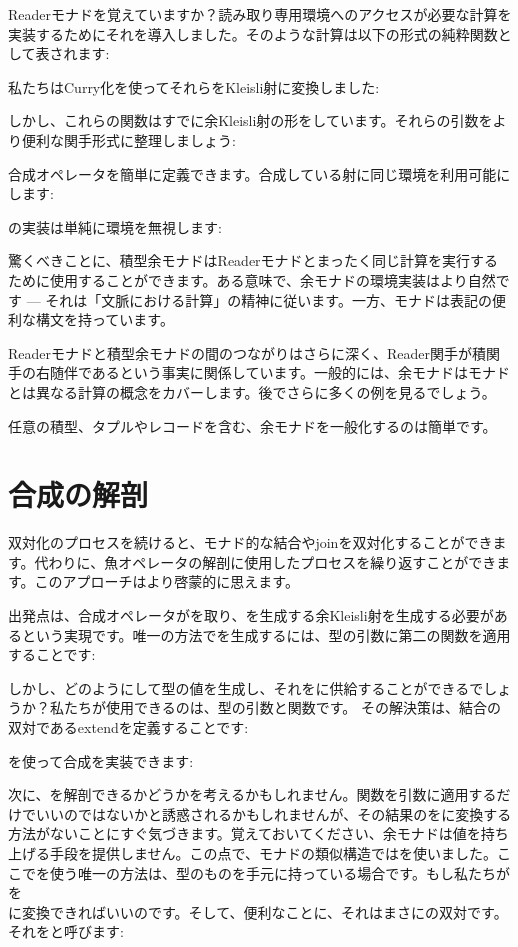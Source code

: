 Readerモナドを覚えていますか？読み取り専用環境へのアクセスが必要な計算を実装するためにそれを導入しました。そのような計算は以下の形式の純粋関数として表されます: 

私たちはCurry化を使ってそれらをKleisli射に変換しました: 

しかし、これらの関数はすでに余Kleisli射の形をしています。それらの引数をより便利な関手形式に整理しましょう: 

合成オペレータを簡単に定義できます。合成している射に同じ環境を利用可能にします: 

の実装は単純に環境を無視します: 

驚くべきことに、積型余モナドはReaderモナドとまったく同じ計算を実行するために使用することができます。ある意味で、余モナドの環境実装はより自然です --- それは「文脈における計算」の精神に従います。一方、モナドは表記の便利な構文を持っています。

Readerモナドと積型余モナドの間のつながりはさらに深く、Reader関手が積関手の右随伴であるという事実に関係しています。一般的には、余モナドはモナドとは異なる計算の概念をカバーします。後でさらに多くの例を見るでしょう。

任意の積型、タプルやレコードを含む、余モナドを一般化するのは簡単です。

\section{合成の解剖}

双対化のプロセスを続けると、モナド的な結合やjoinを双対化することができます。代わりに、魚オペレータの解剖に使用したプロセスを繰り返すことができます。このアプローチはより啓蒙的に思えます。

出発点は、合成オペレータがを取り、を生成する余Kleisli射を生成する必要があるという実現です。唯一の方法でを生成するには、型の引数に第二の関数を適用することです: 

しかし、どのようにして型の値を生成し、それをに供給することができるでしょうか？私たちが使用できるのは、型の引数と関数です。
その解決策は、結合の双対であるextendを定義することです: 

を使って合成を実装できます: 

次に、を解剖できるかどうかを考えるかもしれません。関数を引数に適用するだけでいいのではないかと誘惑されるかもしれませんが、その結果のをに変換する方法がないことにすぐ気づきます。覚えておいてください、余モナドは値を持ち上げる手段を提供しません。この点で、モナドの類似構造ではを使いました。ここでを使う唯一の方法は、型のものを手元に持っている場合です。もし私たちがを\\ に変換できればいいのです。そして、便利なことに、それはまさにの双対です。それをと呼びます: 

